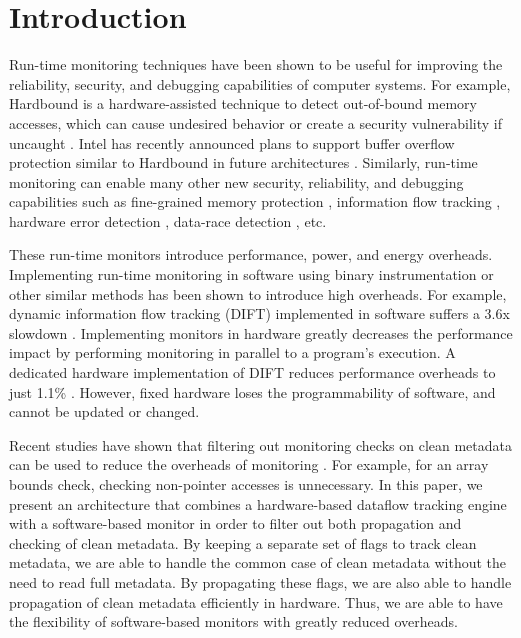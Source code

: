 \section{Introduction}
\label{sec:intro}

Run-time monitoring techniques have been shown to be useful for improving the
reliability, security, and debugging capabilities of computer systems. For
example, Hardbound is a hardware-assisted technique to detect out-of-bound
memory accesses, which can cause undesired behavior or create a security
vulnerability if uncaught \cite{hardbound-asplos08}.  Intel has
recently announced plans to support buffer overflow protection similar to
Hardbound in future architectures \cite{intel-mpx}. Similarly, run-time
monitoring can enable many other new security, reliability, and debugging
capabilities such as fine-grained memory protection \cite{mondrian-asplos02},
information flow tracking \cite{dift-asplos04, testudo-micro08}, hardware error
detection \cite{argus-micro07}, data-race detection \cite{radish-isca12,
cord-hpca06}, etc. 

These run-time monitors introduce performance, power, and energy overheads.
Implementing run-time monitoring in software using binary instrumentation or
other similar methods has been shown to introduce high overheads. For example,
dynamic information flow tracking (DIFT) implemented in software suffers a 3.6x
slowdown \cite{lift-micro06}. Implementing monitors in hardware greatly decreases
the performance impact by performing monitoring in parallel to a program's
execution. A dedicated hardware implementation of DIFT reduces performance
overheads to just 1.1\% \cite{dift-asplos04}. However, fixed hardware loses
the programmability of software, and cannot be updated or changed.

Recent studies have shown that filtering out monitoring checks on clean
metadata can be used to reduce the overheads of monitoring \cite{fade-hpca14}. For example, for
an array bounds check, checking non-pointer accesses is unnecessary. In this
paper, we present an architecture that combines a hardware-based dataflow
tracking engine with a software-based monitor in order to filter out both
propagation and checking of clean metadata. By keeping a separate set of flags
to track clean metadata, we are able to handle the common case of clean
metadata without the need to read full metadata. By propagating these flags, we
are also able to handle propagation of clean metadata efficiently in hardware.
Thus, we are able to have the flexibility of software-based monitors with
greatly reduced overheads.

